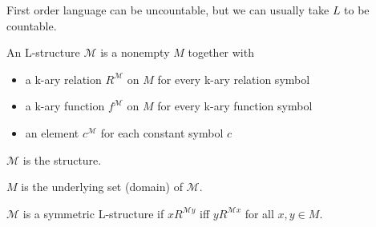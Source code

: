 \documentclass[11pt]{article}
\begin{document}
	First order language can be uncountable, but we can usually take $L$ to be countable.
	
	An L-structure $\mathcal{M}$ is a nonempty $M$ together with 
	\begin{itemize}
		\item a k-ary relation $R^{\mathcal{M}}$ on $M$ for every k-ary relation symbol
		\item a k-ary function $f^{\mathcal{M}}$ on $M$ for every k-ary function symbol
		\item an element $c^{\mathcal{M}}$ for each constant symbol $c$
	\end{itemize}
	
	$\mathcal{M}$ is the structure.
	
	$M$ is the underlying set (domain) of $\mathcal{M}$.
	
	$\mathcal{M}$ is a symmetric L-structure if $xR^{\mathcal{M}y}$ iff $yR^{\mathcal{M}x}$ for all $x, y \in M$.
	
\end{document}
